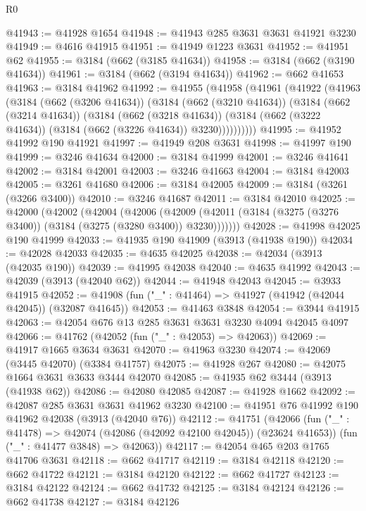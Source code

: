 \begin{lexlean}{R0}
\begin{coremodule}
@41943 := @41928 @1654
@41948 := @41943 @285 @3631 @3631 @41921 @3230
@41949 := @4616 @41915
@41951 := @41949 @1223 @3631
@41952 := @41951 @62
@41955 := @3184 (@662 (@3185 @41634))
@41958 := @3184 (@662 (@3190 @41634))
@41961 := @3184 (@662 (@3194 @41634))
@41962 := @662 @41653
@41963 := @3184 @41962
@41992 := @41955
    (@41958
      (@41961
        (@41922
          (@41963
            (@3184
              (@662 (@3206 @41634))
              (@3184
                (@662 (@3210 @41634))
                (@3184
                  (@662 (@3214 @41634))
                  (@3184
                    (@662 (@3218 @41634))
                    (@3184 (@662 (@3222 @41634)) (@3184 (@662 (@3226 @41634)) @3230))))))))))
@41995 := @41952 @41992 @190 @41921
@41997 := @41949 @208 @3631
@41998 := @41997 @190
@41999 := @3246 @41634
@42000 := @3184 @41999
@42001 := @3246 @41641
@42002 := @3184 @42001
@42003 := @3246 @41663
@42004 := @3184 @42003
@42005 := @3261 @41680
@42006 := @3184 @42005
@42009 := @3184 (@3261 (@3266 @3400))
@42010 := @3246 @41687
@42011 := @3184 @42010
@42025 := @42000
    (@42002
      (@42004
        (@42006
          (@42009 (@42011 (@3184 (@3275 (@3276 @3400)) (@3184 (@3275 (@3280 @3400)) @3230)))))))
@42028 := @41998 @42025 @190 @41999
@42033 := @41935 @190 @41909 (@3913 (@41938 @190))
@42034 := @42028 @42033
@42035 := @4635 @42025
@42038 := @42034 (@3913 (@42035 @190))
@42039 := @41995 @42038
@42040 := @4635 @41992
@42043 := @42039 (@3913 (@42040 @62))
@42044 := @41948 @42043
@42045 := @3933 @41915
@42052 := @41908 (fun ("_" : @41464) => @41927 (@41942 (@42044 @42045)) (@32087 @41645))
@42053 := @41463 @3848
@42054 := @3944 @41915
@42063 := @42054 @676 @13 @285 @3631 @3631 @3230 @4094 @42045 @4097
@42066 := @41762 (@42052 (fun ("_" : @42053) => @42063))
@42069 := @41917 @1665 @3634 @3631
@42070 := @41963 @3230
@42074 := @42069 (@3445 @42070) (@3384 @41757)
@42075 := @41928 @267
@42080 := @42075 @1664 @3631 @3633 @3444 @42070
@42085 := @41935 @62 @3444 (@3913 (@41938 @62))
@42086 := @42080 @42085
@42087 := @41928 @1662
@42092 := @42087 @285 @3631 @3631 @41962 @3230
@42100 := @41951 @76 @41992 @190 @41962 @42038 (@3913 (@42040 @76))
@42112 := @41751
    (@42066
      (fun ("_" : @41478) => @42074 (@42086 (@42092 @42100 @42045)) (@23624 @41653))
      (fun ("_" : @41477 @3848) => @42063))
@42117 := @42054 @465 @203 @1765 @41706 @3631
@42118 := @662 @41717
@42119 := @3184 @42118
@42120 := @662 @41722
@42121 := @3184 @42120
@42122 := @662 @41727
@42123 := @3184 @42122
@42124 := @662 @41732
@42125 := @3184 @42124
@42126 := @662 @41738
@42127 := @3184 @42126

\end{coremodule}
\end{lexlean}
